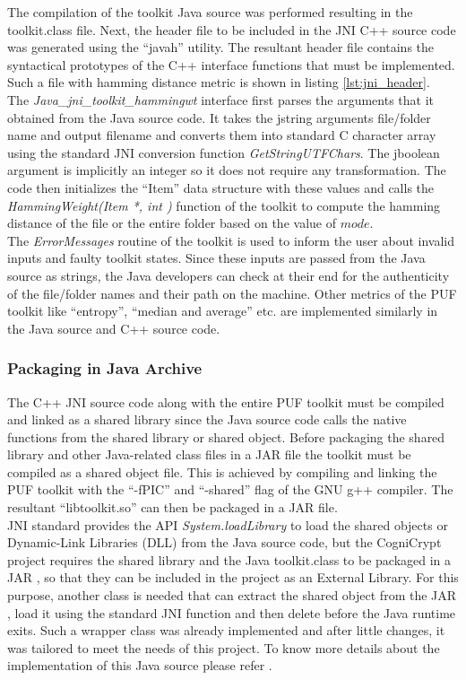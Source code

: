 The compilation of the toolkit Java source was performed resulting in the toolkit.class file. Next, the header file to be included in the JNI C++ source code was generated using the ``javah'' utility. The resultant header file contains the syntactical prototypes of the C++ interface functions that must be implemented. Such a file with hamming distance metric is shown in listing \ref{lst:jni_header}.\\

The \emph{Java\_jni\_toolkit\_hammingwt} interface first parses the arguments that it obtained from the Java source code. It takes the jstring arguments file/folder name and output filename and converts them into standard C character array using the standard JNI conversion function \emph{GetStringUTFChars}. The jboolean argument is implicitly an integer so it does not require any transformation. The code then initializes the ``Item'' data structure with these values and calls the \emph{HammingWeight(Item *, int )} function of the toolkit to compute the hamming distance of the file or the entire folder based on the value of $mode$.\\ 

The \emph{ErrorMessages} routine of the toolkit is used to inform the user about invalid inputs and faulty toolkit states. Since these inputs are passed from the Java source as strings, the Java developers can check at their end for the authenticity of the file/folder names and their path on the machine. Other metrics of the PUF toolkit like ``entropy'', ``median and average'' etc. are implemented similarly in the Java source and C++ source code.

\subsubsection{Packaging in Java Archive}
The C++ JNI source code along with the entire PUF toolkit must be compiled and linked as a shared library since the Java source code calls the native functions from the shared library or shared object. Before packaging the shared library and other Java-related class files in a JAR file the toolkit must be compiled as a shared object file. This is achieved by compiling and linking the PUF toolkit with the
``-fPIC'' and ``-shared'' flag of the GNU g++ compiler. The resultant ``libtoolkit.so'' can then be packaged in a JAR file.\\

JNI standard provides the API \emph{System.loadLibrary} to load the shared objects or Dynamic-Link Libraries (DLL) from the Java source code, but the CogniCrypt project requires the shared library and the Java toolkit.class to be packaged in a JAR , so that they can be included in the project as an External Library. For this purpose, another class is needed that can extract the shared object from the JAR , load it using the standard JNI function and then delete before the Java runtime exits. Such
a wrapper class was already implemented and after little changes, it was tailored to meet the needs of this project. To know more details about the implementation of this Java source please refer \cite{nativeutils}.\\

